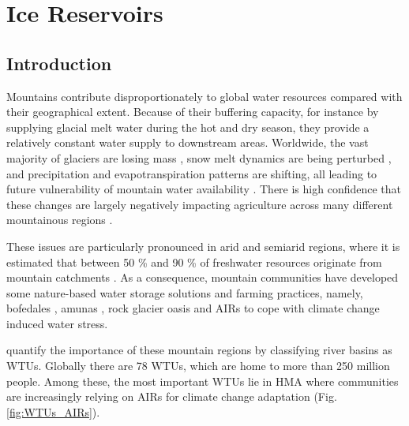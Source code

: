 \chapter{Ice Reservoirs}



\section{Introduction}

Mountains contribute disproportionately to global water resources compared with their geographical extent.
Because of their buffering capacity, for instance by supplying glacial melt water during the hot and dry season,
they provide a relatively constant water supply to downstream areas. Worldwide, the vast majority of glaciers
are losing mass \citep{zempGlobalGlacierMass2019a}, snow melt dynamics are being perturbed
\citep{mukhopadhyayReevaluationSnowmeltGlacial2015, hammondGlobalSnowZone2018}, and precipitation and
evapotranspiration patterns are shifting, all leading to future vulnerability of mountain water availability
\citep{lutzConsistentIncreaseHigh2014}. There is high confidence that these changes are largely negatively
impacting agriculture across many different mountainous regions \citep{ipccCrossChapterPaperMountains2022}.

These issues are particularly pronounced in arid and semiarid regions, where it is estimated that between 50 \%
and 90 \% of freshwater resources originate from mountain catchments
\citep{mukhopadhyayReevaluationSnowmeltGlacial2015, messerliMountainsWorldVulnerable2004}. As a consequence,
mountain communities have developed some nature-based water storage solutions and farming practices, namely,
bofedales \citep{monge-salazarEcohydrologyEcosystemServices2022}, amunas
\citep{ochoa-tocachiPotentialContributionsPreInca2019}, rock glacier oasis \citep{pandeyRockGlacierOasis2022}
and \ac{AIRs} \citep{wangchukIceStupaCompetition2020} to cope with climate change induced water stress.

\citet{immerzeelImportanceVulnerabilityWorld2020} quantify the importance of these mountain regions by
classifying river basins as \ac{WTUs}. Globally there are 78 \ac{WTUs}, which are home to more than 250 million
people. Among these, the most important WTUs lie in \ac{HMA} where communities are increasingly relying on
\ac{AIRs} for climate change adaptation (Fig. \ref{fig:WTUs_AIRs}). 

